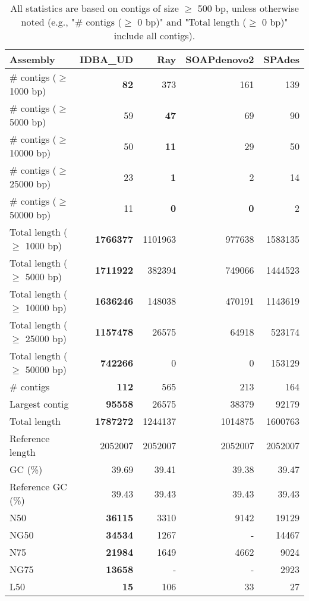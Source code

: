\documentclass[12pt,a4paper]{article}
\begin{document}
\begin{table}[ht]
\begin{center}
\caption{All statistics are based on contigs of size $\geq$ 500 bp, unless otherwise noted (e.g., "\# contigs ($\geq$ 0 bp)" and "Total length ($\geq$ 0 bp)" include all contigs).}
\begin{tabular}{|l*{4}{|r}|}
\hline
Assembly & IDBA\_UD & Ray & SOAPdenovo2 & SPAdes \\ \hline
\# contigs ($\geq$ 1000 bp) & {\bf 82} & 373 & 161 & 139 \\ \hline
\# contigs ($\geq$ 5000 bp) & 59 & {\bf 47} & 69 & 90 \\ \hline
\# contigs ($\geq$ 10000 bp) & 50 & {\bf 11} & 29 & 50 \\ \hline
\# contigs ($\geq$ 25000 bp) & 23 & {\bf 1} & 2 & 14 \\ \hline
\# contigs ($\geq$ 50000 bp) & 11 & {\bf 0} & {\bf 0} & 2 \\ \hline
Total length ($\geq$ 1000 bp) & {\bf 1766377} & 1101963 & 977638 & 1583135 \\ \hline
Total length ($\geq$ 5000 bp) & {\bf 1711922} & 382394 & 749066 & 1444523 \\ \hline
Total length ($\geq$ 10000 bp) & {\bf 1636246} & 148038 & 470191 & 1143619 \\ \hline
Total length ($\geq$ 25000 bp) & {\bf 1157478} & 26575 & 64918 & 523174 \\ \hline
Total length ($\geq$ 50000 bp) & {\bf 742266} & 0 & 0 & 153129 \\ \hline
\# contigs & {\bf 112} & 565 & 213 & 164 \\ \hline
Largest contig & {\bf 95558} & 26575 & 38379 & 92179 \\ \hline
Total length & {\bf 1787272} & 1244137 & 1014875 & 1600763 \\ \hline
Reference length & 2052007 & 2052007 & 2052007 & 2052007 \\ \hline
GC (\%) & 39.69 & 39.41 & 39.38 & 39.47 \\ \hline
Reference GC (\%) & 39.43 & 39.43 & 39.43 & 39.43 \\ \hline
N50 & {\bf 36115} & 3310 & 9142 & 19129 \\ \hline
NG50 & {\bf 34534} & 1267 & - & 14467 \\ \hline
N75 & {\bf 21984} & 1649 & 4662 & 9024 \\ \hline
NG75 & {\bf 13658} & - & - & 2923 \\ \hline
L50 & {\bf 15} & 106 & 33 & 27 \\ \hline

\end{tabular}
\end{center}
\end{table}
\end{document}
